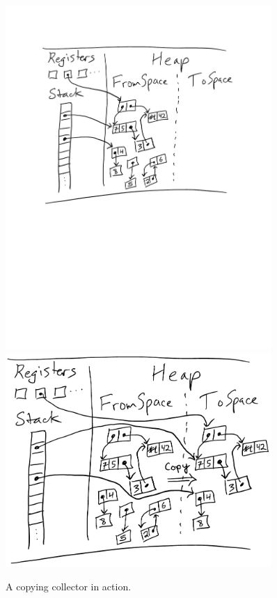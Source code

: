 \documentclass[11pt]{book}
\begin{document}
\begin{figure}[tbp]
\centering
\includegraphics[width=0.9\textwidth]{CopyingCollector} \\
\includegraphics[width=0.9\textwidth]{CopyCollector2}
\caption{A copying collector in action.}
\label{fig:copying-collector}
\end{figure}
\end{document}
